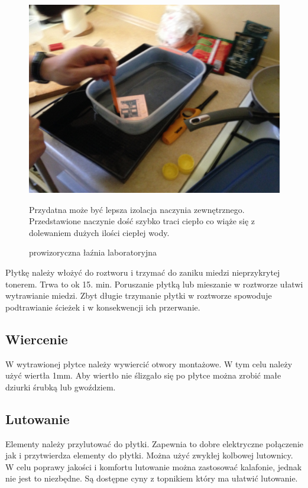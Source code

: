 \documentclass[a4paper,11pt]{article}
\def\SCALE{0.6}
\begin{document}
\begin{figure}[H]
	\centering
	\includegraphics[width=\SCALE
	\paperwidth]{wanienka}
	\caption{prowizoryczna łaźnia laboratoryjna}
Przydatna może być lepsza izolacja naczynia zewnętrznego. Przedstawione naczynie dość szybko traci ciepło co wiąże się z dolewaniem dużych ilości ciepłej wody.
\end{figure}


Płytkę należy włożyć do roztworu i trzymać do zaniku miedzi nieprzykrytej tonerem. Trwa to ok 15. min. Poruszanie płytką lub mieszanie w roztworze ułatwi wytrawianie miedzi. Zbyt długie trzymanie płytki w roztworze spowoduje podtrawianie ścieżek i w konsekwencji ich przerwanie.

\subsection{Wiercenie}
W wytrawionej płytce należy wywiercić otwory montażowe. W tym celu należy użyć wiertła 1mm. Aby wiertło nie ślizgało się po płytce można zrobić małe dziurki śrubką lub gwoździem.

\subsection{Lutowanie}
Elementy należy przylutować do płytki. Zapewnia to dobre elektryczne połączenie jak i przytwierdza elementy do płytki. Można użyć zwykłej kolbowej lutownicy. W celu poprawy jakości i komfortu lutowanie można zastosować kalafonie, jednak nie jest to niezbędne. Są dostępne cyny z topnikiem który ma ułatwić lutowanie.
\end{document}
